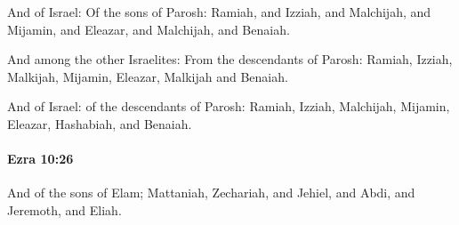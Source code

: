 			\begin{versebox}
					\item[BHS] 
					\item[LXX] 
					\item[ASV] And of Israel: Of the sons of Parosh: Ramiah, and Izziah, and Malchijah, and Mijamin, and Eleazar, and Malchijah, and Benaiah.
					\item[NIV] And among the other Israelites: From the descendants of Parosh: Ramiah, Izziah, Malkijah, Mijamin, Eleazar, Malkijah and Benaiah.
					\item[NRSV] And of Israel: of the descendants of Parosh: Ramiah, Izziah, Malchijah, Mijamin, Eleazar, Hashabiah, and Benaiah.
			\end{versebox}

		\paragraph{Ezra 10:26} %
			\label{EZRA-10-26}

			And of the sons of Elam; Mattaniah, Zechariah, and Jehiel, and Abdi, and Jeremoth, and Eliah.

